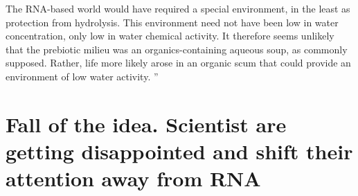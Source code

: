 \documentclass[12pt]{paper}
\begin{document}
The RNA-based world would have required a special
environment, in the least as protection from hydrolysis.
This environment need not have been low in water concentration, only low in water chemical 
activity. It therefore
seems unlikely that the prebiotic milieu was an organics-containing aqueous soup, as commonly 
supposed. Rather,
life more likely arose in an organic scum that could provide an environment of low water activity. 
''\cite{Pace1991} 

\section{Fall of the idea. Scientist are getting disappointed and shift their attention away from 
RNA}


  
   
\end{document}

